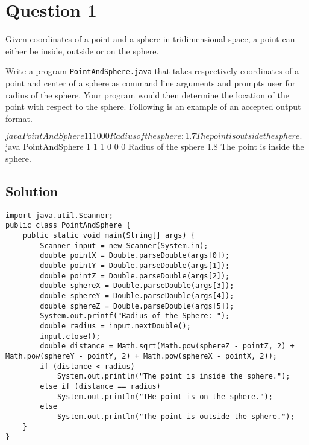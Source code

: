 \documentclass[12pt,letterpaper,twoside]{article}
\begin{document}


\section*{Question 1}

Given coordinates of a point and a sphere in tridimensional space, a point can either be inside, outside or on the sphere.

Write a program \texttt{PointAndSphere.java} that takes respectively coordinates of a point and center of a sphere as command line arguments and prompts user for radius of the sphere.
Your program would then determine the location of the point with respect to the sphere.
Following is an example of an accepted output format.

\begin{terminal}
$ java PointAndSphere 1 1 1 0 0 0
Radius of the sphere: 1.7
The point is outside the sphere.
$ java PointAndSphere 1 1 1 0 0 0
Radius of the sphere 1.8
The point is inside the sphere.
\end{terminal}

\subsection*{Solution}

\lstset{language=Java,tabsize=2}
\begin{lstlisting}
import java.util.Scanner;
public class PointAndSphere {
	public static void main(String[] args) {
		Scanner input = new Scanner(System.in);
		double pointX = Double.parseDouble(args[0]);
		double pointY = Double.parseDouble(args[1]);
		double pointZ = Double.parseDouble(args[2]);
		double sphereX = Double.parseDouble(args[3]);
		double sphereY = Double.parseDouble(args[4]);
		double sphereZ = Double.parseDouble(args[5]);
		System.out.printf("Radius of the Sphere: ");
		double radius = input.nextDouble();
		input.close();
		double distance = Math.sqrt(Math.pow(sphereZ - pointZ, 2) + Math.pow(sphereY - pointY, 2) + Math.pow(sphereX - pointX, 2));
		if (distance < radius)
			System.out.println("The point is inside the sphere.");
		else if (distance == radius)
			System.out.println("THe point is on the sphere.");
		else
			System.out.println("The point is outside the sphere.");
	}
}
\end{lstlisting}
\end{document}
